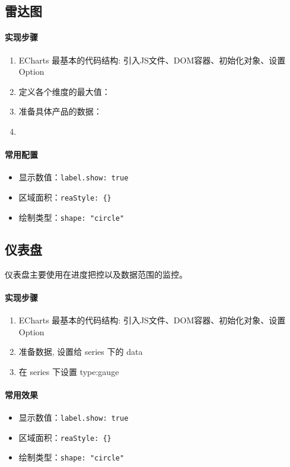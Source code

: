 \subsection{雷达图}
\paragraph{实现步骤}
\begin{enumerate}
    \item ECharts 最基本的代码结构: 引入JS文件、DOM容器、初始化对象、设置Option
    \item 定义各个维度的最大值：
    \item 准备具体产品的数据：
    \item 
\end{enumerate}

\paragraph{常用配置}
\begin{itemize}
    \item 显示数值：\verb|label.show: true|
    \item 区域面积：\verb|reaStyle: {}|
    \item 绘制类型：\verb|shape: "circle"|
\end{itemize}

\subsection{仪表盘}
仪表盘主要使用在进度把控以及数据范围的监控。
\paragraph{实现步骤}
\begin{enumerate}
    \item ECharts 最基本的代码结构: 引入JS文件、DOM容器、初始化对象、设置Option
    \item 准备数据, 设置给 series 下的 data
    \item 在 series 下设置 type:gauge
\end{enumerate}
\paragraph{常用效果}
\begin{itemize}
    \item 显示数值：\verb|label.show: true|
    \item 区域面积：\verb|reaStyle: {}|
    \item 绘制类型：\verb|shape: "circle"|
\end{itemize}

